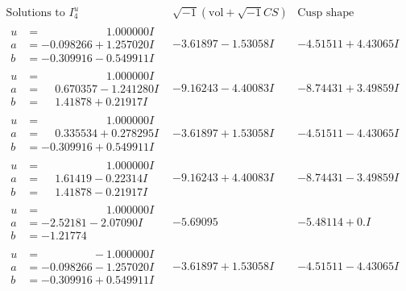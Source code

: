 \documentclass[1p]{elsarticle_modified}
\theoremstyle{definition}
\newcommand{\I}{\sqrt{-1}}
\begin{document}
$$\begin{array}{c|c|c}  
\text{Solutions to }I^u_{4}& \I (\text{vol} + \sqrt{-1}CS) & \text{Cusp shape}\\
 \hline 
\begin{aligned}
u &= \phantom{-0.000000 -}1.000000 I \\
a &= -0.098266 + 1.257020 I \\
b &= -0.309916 - 0.549911 I\end{aligned}
 & -3.61897 - 1.53058 I & -4.51511 + 4.43065 I \\ \hline\begin{aligned}
u &= \phantom{-0.000000 -}1.000000 I \\
a &= \phantom{-}0.670357 - 1.241280 I \\
b &= \phantom{-}1.41878 + 0.21917 I\end{aligned}
 & -9.16243 - 4.40083 I & -8.74431 + 3.49859 I \\ \hline\begin{aligned}
u &= \phantom{-0.000000 -}1.000000 I \\
a &= \phantom{-}0.335534 + 0.278295 I \\
b &= -0.309916 + 0.549911 I\end{aligned}
 & -3.61897 + 1.53058 I & -4.51511 - 4.43065 I \\ \hline\begin{aligned}
u &= \phantom{-0.000000 -}1.000000 I \\
a &= \phantom{-}1.61419 - 0.22314 I \\
b &= \phantom{-}1.41878 - 0.21917 I\end{aligned}
 & -9.16243 + 4.40083 I & -8.74431 - 3.49859 I \\ \hline\begin{aligned}
u &= \phantom{-0.000000 -}1.000000 I \\
a &= -2.52181 - 2.07090 I \\
b &= -1.21774\phantom{ +0.000000I}\end{aligned}
 & -5.69095\phantom{ +0.000000I} & -5.48114 + 0. I\phantom{ +0.000000I} \\ \hline\begin{aligned}
u &= \phantom{-0.000000 } -1.000000 I \\
a &= -0.098266 - 1.257020 I \\
b &= -0.309916 + 0.549911 I\end{aligned}
 & -3.61897 + 1.53058 I & -4.51511 - 4.43065 I \\ \hline\begin{aligned}

\end{aligned}
\end{array}$$
\end{document}
